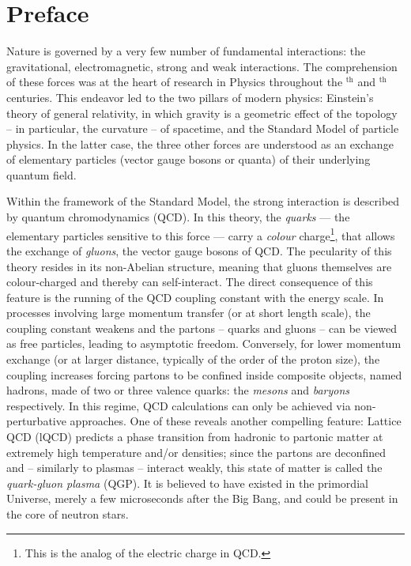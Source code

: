 \chapter{Preface}
\label{chap:Chapter1}

Nature is governed by a very few number of fundamental interactions: the gravitational, electromagnetic, strong and weak interactions. The comprehension of these forces was at the heart of research in Physics throughout the $^{\textrm{th}}$ and $^{\textrm{th}}$ centuries. This endeavor led to the two pillars of modern physics: Einstein's theory of general relativity, in which gravity is a geometric effect of the topology -- in particular, the curvature -- of spacetime, and the Standard Model of particle physics. In the latter case, the three other forces are understood as an exchange of elementary particles (vector gauge bosons or quanta) of their underlying quantum field.

Within the framework of the Standard Model, the strong interaction is described by quantum chromodynamics (QCD). In this theory, the \textit{quarks} --- the elementary particles sensitive to this force --- carry a \textit{colour} charge\footnote{This is the analog of the electric charge in QCD.}, that allows the exchange of \textit{gluons}, the vector gauge bosons of QCD. The pecularity of this theory resides in its non-Abelian structure, meaning that gluons themselves are colour-charged and thereby can self-interact. The direct consequence of this feature is the running of the QCD coupling constant with the energy scale. In processes involving large momentum transfer (or at short length scale), the coupling constant weakens and the partons -- quarks and gluons -- can be viewed as free particles, leading to asymptotic freedom. Conversely, for lower momentum exchange (or at larger distance, typically of the order of the proton size), the coupling increases forcing partons to be confined inside composite objects, named hadrons, made of two or three valence quarks: the \textit{mesons} and \textit{baryons} respectively. In this regime, QCD calculations can only be achieved via non-perturbative approaches. One of these reveals another compelling feature: Lattice QCD (lQCD) predicts a phase transition from hadronic to partonic matter at extremely high temperature and/or densities; since the partons are deconfined and -- similarly to plasmas -- interact weakly, this state of matter is called the \textit{quark-gluon plasma} (QGP). It is believed to have existed in the primordial Universe, merely a few microseconds after the Big Bang, and could be present in the core of neutron stars. \\

